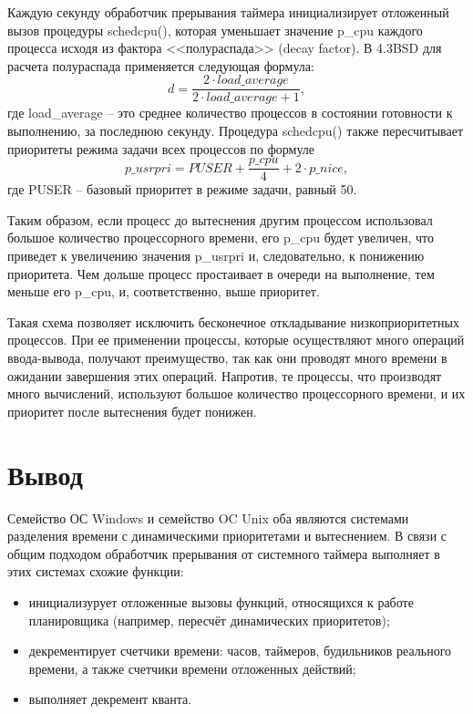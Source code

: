 Каждую секунду обработчик прерывания таймера инициализирует отложенный вызов процедуры {\ttfamily schedcpu()}, которая уменьшает значение {\ttfamily p{\_}cpu} каждого процесса исходя из фактора <<полураспада>> (decay factor). В {\ttfamily 4.3BSD} для расчета полураспада применяется следующая формула:
\[
d = \frac{2\cdot load{\_}average}{2\cdot load{\_}average + 1},
\]
где  {\ttfamily load{\_}average} -- это среднее количество процессов в состоянии готовности к выполнению, за последнюю секунду. Процедура {\ttfamily schedcpu()} также пересчитывает приоритеты режима задачи всех процессов по формуле
\[
{p\_usrpri} = PUSER + \frac{p{\_}cpu}{4} + 2\cdot {p{\_}nice},
\]
где {\ttfamily PUSER} -- базовый приоритет в режиме задачи, равный 50.

Таким образом, если процесс до вытеснения другим процессом использовал большое количество процессорного времени, его {\ttfamily p{\_}cpu} будет увеличен, что приведет к увеличению значения {\ttfamily p{\_}usrpri} и, следовательно, к понижению приоритета. Чем дольше процесс простаивает в очереди на выполнение, тем меньше его {\ttfamily p{\_}cpu}, и, соответственно, выше приоритет. 

Такая схема позволяет исключить бесконечное откладывание низкоприоритетных процессов. При ее применении процессы, которые осуществляют много операций ввода-вывода, получают преимущество, так как они проводят много времени в ожидании завершения этих операций. Напротив, те процессы, что производят много вычислений, используют большое количество процессорного времени, и их приоритет после вытеснения будет понижен. 


\chapter*{Вывод}

Семейство ОС Windows и семейство OC Unix оба являются системами разделения времени с динамическими приоритетами и вытеснением. В связи с общим подходом обработчик прерывания от системного таймера выполняет в этих системах схожие функции: 

\begin{itemize}
	\item инициализурует отложенные вызовы функций, относящихся к работе планировщика (например, пересчёт динамических приоритетов);
	\item декрементирует счетчики времени: часов, таймеров, будильников реального времени, а также счетчики времени отложенных действий;
	\item выполняет декремент кванта.
\end{itemize}

